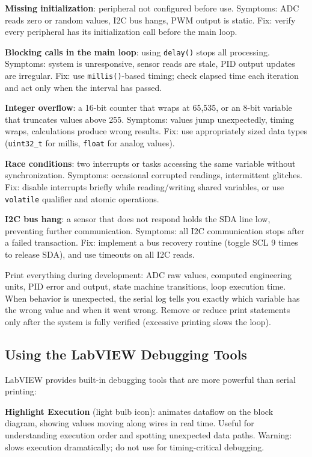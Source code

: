 \documentclass[11pt,letterpaper,twoside,openany]{book}
\begin{document}
\textbf{Missing initialization}: peripheral not configured before use. Symptoms: ADC reads zero or random values, I2C bus hangs, PWM output is static. Fix: verify every peripheral has its initialization call before the main loop.

\textbf{Blocking calls in the main loop}: using \texttt{delay()} stops all processing. Symptoms: system is unresponsive, sensor reads are stale, PID output updates are irregular. Fix: use \texttt{millis()}-based timing; check elapsed time each iteration and act only when the interval has passed.

\textbf{Integer overflow}: a 16-bit counter that wraps at 65,535, or an 8-bit variable that truncates values above 255. Symptoms: values jump unexpectedly, timing wraps, calculations produce wrong results. Fix: use appropriately sized data types (\texttt{uint32\_t} for millis, \texttt{float} for analog values).

\textbf{Race conditions}: two interrupts or tasks accessing the same variable without synchronization. Symptoms: occasional corrupted readings, intermittent glitches. Fix: disable interrupts briefly while reading/writing shared variables, or use \texttt{volatile} qualifier and atomic operations.

\textbf{I2C bus hang}: a sensor that does not respond holds the SDA line low, preventing further communication. Symptoms: all I2C communication stops after a failed transaction. Fix: implement a bus recovery routine (toggle SCL 9 times to release SDA), and use timeouts on all I2C reads.

\begin{tipbox}
Print everything during development: ADC raw values, computed engineering units, PID error and output, state machine transitions, loop execution time. When behavior is unexpected, the serial log tells you exactly which variable has the wrong value and when it went wrong. Remove or reduce print statements only after the system is fully verified (excessive printing slows the loop).
\end{tipbox}

\subsection{Using the LabVIEW Debugging Tools}
LabVIEW provides built-in debugging tools that are more powerful than serial printing:

\textbf{Highlight Execution} (light bulb icon): animates dataflow on the block diagram, showing values moving along wires in real time. Useful for understanding execution order and spotting unexpected data paths. Warning: slows execution dramatically; do not use for timing-critical debugging.
\end{document}
